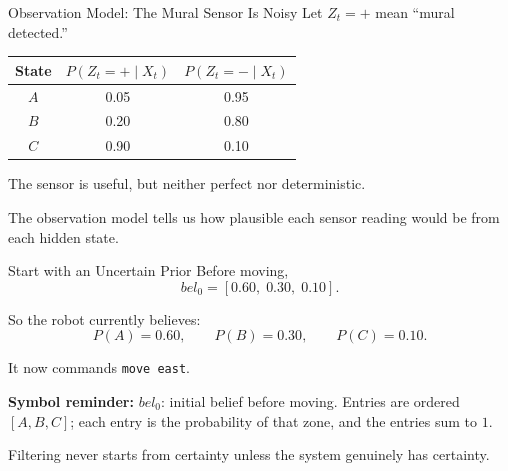 \documentclass[aspectratio=169,10pt]{beamer}
\newcommand{\equationlegend}[1]{%
  \par\smallskip
  \begingroup
    \setlength{\fboxsep}{5pt}%
    \noindent\colorbox{DeckSoft}{%
      \parbox{\dimexpr\linewidth-2\fboxsep\relax}{%
        \footnotesize\textbf{Symbol reminder:} #1%
      }%
    }\par
  \endgroup
  \smallskip
}
\begin{document}
\begin{frame}[shrink=10]{Observation Model: The Mural Sensor Is Noisy}
  Let $Z_t=+$ mean ``mural detected.''

  \begin{center}
    \renewcommand{\arraystretch}{1.35}
    \begin{tabular}{c|cc}
      State & $P(Z_t=+\mid X_t)$ & $P(Z_t=-\mid X_t)$ \\\hline
      $A$ & 0.05 & 0.95 \\
      $B$ & 0.20 & 0.80 \\
      $C$ & 0.90 & 0.10 \\
    \end{tabular}
  \end{center}

  The sensor is useful, but neither perfect nor deterministic.

  \begin{keyidea}
    The observation model tells us how plausible each sensor reading would be from each hidden state.
  \end{keyidea}
\end{frame}

\begin{frame}[shrink=10]{Start with an Uncertain Prior}
  Before moving,
  \[
    bel_0=[0.60,\;0.30,\;0.10].
  \]

  So the robot currently believes:
  \[
    P(A)=0.60,\qquad P(B)=0.30,\qquad P(C)=0.10.
  \]

  It now commands \texttt{move east}.

  \equationlegend{$bel_0$: initial belief before moving. Entries are ordered $[A,B,C]$; each entry is the probability of that zone, and the entries sum to $1$.}

  \begin{keyidea}
    Filtering never starts from certainty unless the system genuinely has certainty.
  \end{keyidea}
\end{frame}
\end{document}
